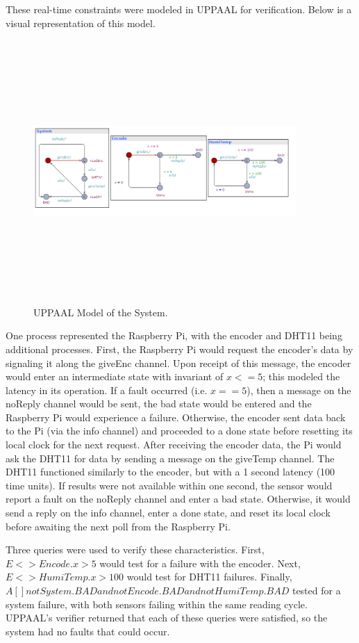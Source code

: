 \documentclass[letterpaper, 12pt]{article}
\begin{document}
\newpage
These real-time constraints were modeled in UPPAAL for verification.  Below is a visual representation of this model. 
\begin{figure}[H]
	\centering
	\includegraphics[width=10cm,height=10cm,keepaspectratio]{system.png}
	\caption[Model]{UPPAAL Model of the System.}
	\label{fig:model}
\end{figure}
One process represented the Raspberry Pi, with the encoder and DHT11 being additional processes.  First, the Raspberry Pi would request the encoder's data by signaling it along the giveEnc channel.  Upon receipt of this message, the encoder would enter an intermediate state with invariant of $x <= 5$; this modeled the latency in its operation.  If a fault occurred (i.e. $x == 5$), then a message on the noReply channel would be sent, the bad state would be entered and the Raspberry Pi would experience a failure.  Otherwise, the encoder sent data back to the Pi (via the info channel) and proceeded to a done state before resetting its local clock for the next request.  After receiving the encoder data, the Pi would ask the DHT11 for data by sending a message on the giveTemp channel.  The DHT11 functioned similarly to the encoder, but with a 1 second latency (100 time units).  If results were not available within one second, the sensor would report a fault on the noReply channel and enter a bad state.  Otherwise, it would send a reply on the info channel, enter a done state, and reset its local clock before awaiting the next poll from the Raspberry Pi.

\indent Three queries were used to verify these characteristics.  First, $E <> Encode.x > 5$ would test for a failure with the encoder.  Next, $E <> HumiTemp.x > 100$ would test for DHT11 failures.  Finally, $A[] not System.BAD and not Encode.BAD and not HumiTemp.BAD$ tested for a system failure, with both sensors failing within the same reading cycle.  UPPAAL's verifier returned that each of these queries were satisfied, so the system had no faults that could occur.
\end{document}

